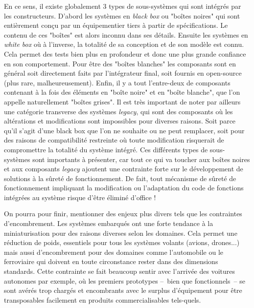 \documentclass[french, a4paper, 11pt, twoside, pdftex]{StyleThese}
\begin{document}
	En ce sens, il existe globalement 3 types de sous-systèmes qui sont intégrés par les constructeurs. 
	D'abord les systèmes en \textit{black box} ou "boîtes noires" qui sont entièrement conçu par un équipementier tiers à partir de spécifications. Le contenu de ces "boîtes" est alors inconnu dans ses détails.
	Ensuite les systèmes en \textit{white box} où à l'inverse, la totalité de sa conception et de son modèle est connu. Cela permet des tests bien plus en profondeur et donc une plus grande confiance en son comportement. Pour être des "boîtes blanches" les composants sont en général soit directement faits par l'intégrateur final, soit fournis en open-source (plus rare, malheureusement).
	Enfin, il y a tout l'entre-deux de composants contenant à la fois des éléments en "boîte noire" et en "boîte blanche", que l'on appelle naturellement "boîtes grises".
	Il est très important de noter par ailleurs une catégorie transverse des systèmes \textit{legacy}, qui sont des composants où les altérations et modifications sont impossibles pour diverses raisons. Soit parce qu'il s'agit d'une black box que l'on ne souhaite ou ne peut remplacer, soit pour des raisons de compatibilité restreinte où toute modification risquerait de compromettre la totalité du système intégré. 
	Ces différents types de sous-systèmes sont importants à présenter, car tout ce qui va toucher aux boîtes noires et aux composants \textit{legacy} ajoutent une contrainte forte sur le développement de solutions à la sûreté de fonctionnement. De fait, tout mécanisme de sûreté de fonctionnement impliquant la modification ou l'adaptation du code de fonctions intégrées au système risque d'être éliminé d'office !

	On pourra pour finir, mentionner des enjeux plus divers tels que les contraintes d'encombrement. Les systèmes embarqués ont une forte tendance à la miniaturisation pour des raisons diverses selon les domaines. Cela permet une réduction de poids, essentiels pour tous les systèmes volants (avions, drones...) mais aussi d'encombrement pour des domaines comme l'automobile ou le ferroviaire qui doivent en toute circonstance rester dans des dimensions standards. Cette contrainte se fait beaucoup sentir avec l'arrivée des voitures autonomes par exemple, où les premiers prototypes --~bien que fonctionnels~-- se sont avérés trop chargés et encombrants avec le surplus d'équipement pour être transposables facilement en produits commercialisables tels-quels.
	
\end{document}
